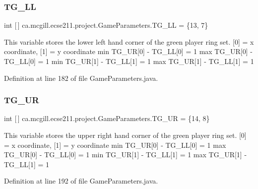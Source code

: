 \subsubsection{\texorpdfstring{T\+G\+\_\+\+LL}{TG\_LL}}
{\footnotesize\ttfamily int \mbox{[}$\,$\mbox{]} ca.\+mcgill.\+ecse211.\+project.\+Game\+Parameters.\+T\+G\+\_\+\+LL = \{13, 7\}\hspace{0.3cm}{\ttfamily [static]}}

This variable stores the lower left hand corner of the green player ring set. \mbox{[}0\mbox{]} = x coordinate, \mbox{[}1\mbox{]} = y coordinate min T\+G\+\_\+\+UR\mbox{[}0\mbox{]} -\/ T\+G\+\_\+\+LL\mbox{[}0\mbox{]} = 1 max T\+G\+\_\+\+UR\mbox{[}0\mbox{]} -\/ T\+G\+\_\+\+LL\mbox{[}0\mbox{]} = 1 min T\+G\+\_\+\+UR\mbox{[}1\mbox{]} -\/ T\+G\+\_\+\+LL\mbox{[}1\mbox{]} = 1 max T\+G\+\_\+\+UR\mbox{[}1\mbox{]} -\/ T\+G\+\_\+\+LL\mbox{[}1\mbox{]} = 1 

Definition at line 182 of file Game\+Parameters.\+java.

\mbox{\label{classca_1_1mcgill_1_1ecse211_1_1project_1_1_game_parameters_aa8220987d04f322d9480db7cc073ffd2}} 
\subsubsection{\texorpdfstring{T\+G\+\_\+\+UR}{TG\_UR}}
{\footnotesize\ttfamily int \mbox{[}$\,$\mbox{]} ca.\+mcgill.\+ecse211.\+project.\+Game\+Parameters.\+T\+G\+\_\+\+UR = \{14, 8\}\hspace{0.3cm}{\ttfamily [static]}}

This variable stores the upper right hand corner of the green player ring set. \mbox{[}0\mbox{]} = x coordinate, \mbox{[}1\mbox{]} = y coordinate min T\+G\+\_\+\+UR\mbox{[}0\mbox{]} -\/ T\+G\+\_\+\+LL\mbox{[}0\mbox{]} = 1 max T\+G\+\_\+\+UR\mbox{[}0\mbox{]} -\/ T\+G\+\_\+\+LL\mbox{[}0\mbox{]} = 1 min T\+G\+\_\+\+UR\mbox{[}1\mbox{]} -\/ T\+G\+\_\+\+LL\mbox{[}1\mbox{]} = 1 max T\+G\+\_\+\+UR\mbox{[}1\mbox{]} -\/ T\+G\+\_\+\+LL\mbox{[}1\mbox{]} = 1 

Definition at line 192 of file Game\+Parameters.\+java.

